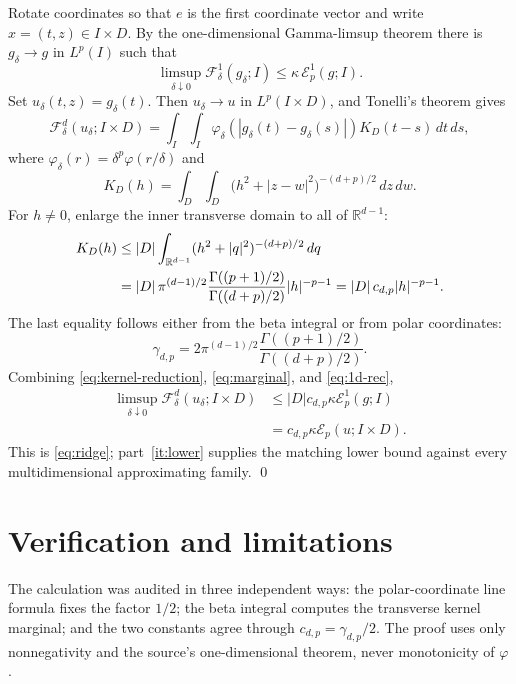 \documentclass[11pt]{article}
\newcommand{\R}{\mathbb R}
\newcommand{\F}{\mathcal F}
\newcommand{\E}{\mathcal E}
\begin{document}
Rotate coordinates so that $e$ is the first coordinate vector and write
$x=(t,z)\in I\times D$.  By the one-dimensional Gamma-limsup theorem there
is $g_\delta\to g$ in $L^p(I)$ such that
\begin{equation}\label{eq:1d-rec}
 \limsup_{\delta\downarrow0}\F^1_\delta(g_\delta;I)
 \leq\kappa\,\E_p^1(g;I).
\end{equation}
Set $u_\delta(t,z)=g_\delta(t)$.  Then
$u_\delta\to u$ in $L^p(I\times D)$, and Tonelli's theorem gives
\begin{equation}\label{eq:kernel-reduction}
 \F^d_\delta(u_\delta;I\times D)
 =\int_I\int_I \varphi_\delta(|g_\delta(t)-g_\delta(s)|)
 K_D(t-s)\,dt\,ds,
\end{equation}
where $\varphi_\delta(r)=\delta^p\varphi(r/\delta)$ and
\[
 K_D(h)=\int_D\int_D
 \bigl(h^2+|z-w|^2\bigr)^{-(d+p)/2}\,dz\,dw.
\]
For $h\neq0$, enlarge the inner transverse domain to all of $\R^{d-1}$:
\begin{align}
 K_D(h)
 &\leq |D|\int_{\R^{d-1}}
 (h^2+|q|^2)^{-(d+p)/2}\,dq\notag\\
 &=|D|\,\pi^{(d-1)/2}
 \frac{\Gamma((p+1)/2)}{\Gamma((d+p)/2)}|h|^{-p-1}
 =|D|\,c_{d,p}|h|^{-p-1}.\label{eq:marginal}
\end{align}
The last equality follows either from the beta integral or from polar
coordinates:
\[
 \gamma_{d,p}
 =2\pi^{(d-1)/2}\frac{\Gamma((p+1)/2)}{\Gamma((d+p)/2)}.
\]
Combining \eqref{eq:kernel-reduction}, \eqref{eq:marginal}, and
\eqref{eq:1d-rec},
\begin{align*}
 \limsup_{\delta\downarrow0}\F^d_\delta(u_\delta;I\times D)
 &\leq |D|c_{d,p}\kappa\E_p^1(g;I)\\
 &=c_{d,p}\kappa\E_p(u;I\times D).
\end{align*}
This is \eqref{eq:ridge}; part~\ref{it:lower} supplies the matching lower
bound against every multidimensional approximating family.
\qed

\section{Verification and limitations}

The calculation was audited in three independent ways: the polar-coordinate
line formula fixes the factor $1/2$; the beta integral computes the transverse
kernel marginal; and the two constants agree through
$c_{d,p}=\gamma_{d,p}/2$.  The proof uses only nonnegativity and the source's
one-dimensional theorem, never monotonicity of $\varphi$.
\end{document}
